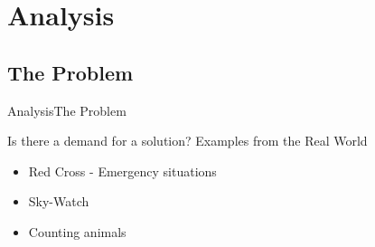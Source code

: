 \author{Bjarke H. Søndergaard}



\section{Analysis}
\subsection{The Problem}
\begin{frame}{Analysis}{The Problem}
    \begin{block}{Is there a demand for a solution?}
    Examples from the Real World
    \begin{itemize}
        \item Red Cross - Emergency situations
        \item Sky-Watch
        \item Counting animals
    \end{itemize}
    \end{block}
\end{frame}

